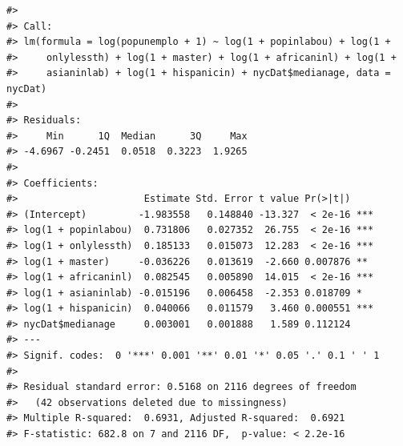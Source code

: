 \documentclass[
  11pt,
]{book}
\newenvironment{Shaded}{\begin{snugshade}}{\end{snugshade}}
\newcommand{\AttributeTok}[1]{\textcolor[rgb]{0.77,0.63,0.00}{#1}}
\newcommand{\CommentTok}[1]{\textcolor[rgb]{0.56,0.35,0.01}{\textit{#1}}}
\newcommand{\ConstantTok}[1]{\textcolor[rgb]{0.00,0.00,0.00}{#1}}
\newcommand{\DecValTok}[1]{\textcolor[rgb]{0.00,0.00,0.81}{#1}}
\newcommand{\FunctionTok}[1]{\textcolor[rgb]{0.00,0.00,0.00}{#1}}
\newcommand{\NormalTok}[1]{#1}
\newcommand{\OtherTok}[1]{\textcolor[rgb]{0.56,0.35,0.01}{#1}}
\newcommand{\SpecialCharTok}[1]{\textcolor[rgb]{0.00,0.00,0.00}{#1}}
\begin{document}
\begin{verbatim}
#> 
#> Call:
#> lm(formula = log(popunemplo + 1) ~ log(1 + popinlabou) + log(1 + 
#>     onlylessth) + log(1 + master) + log(1 + africaninl) + log(1 + 
#>     asianinlab) + log(1 + hispanicin) + nycDat$medianage, data = nycDat)
#> 
#> Residuals:
#>     Min      1Q  Median      3Q     Max 
#> -4.6967 -0.2451  0.0518  0.3223  1.9265 
#> 
#> Coefficients:
#>                      Estimate Std. Error t value Pr(>|t|)    
#> (Intercept)         -1.983558   0.148840 -13.327  < 2e-16 ***
#> log(1 + popinlabou)  0.731806   0.027352  26.755  < 2e-16 ***
#> log(1 + onlylessth)  0.185133   0.015073  12.283  < 2e-16 ***
#> log(1 + master)     -0.036226   0.013619  -2.660 0.007876 ** 
#> log(1 + africaninl)  0.082545   0.005890  14.015  < 2e-16 ***
#> log(1 + asianinlab) -0.015196   0.006458  -2.353 0.018709 *  
#> log(1 + hispanicin)  0.040066   0.011579   3.460 0.000551 ***
#> nycDat$medianage     0.003001   0.001888   1.589 0.112124    
#> ---
#> Signif. codes:  0 '***' 0.001 '**' 0.01 '*' 0.05 '.' 0.1 ' ' 1
#> 
#> Residual standard error: 0.5168 on 2116 degrees of freedom
#>   (42 observations deleted due to missingness)
#> Multiple R-squared:  0.6931, Adjusted R-squared:  0.6921 
#> F-statistic: 682.8 on 7 and 2116 DF,  p-value: < 2.2e-16
\end{verbatim}

\begin{Shaded}
\end{Shaded}
\end{document}
